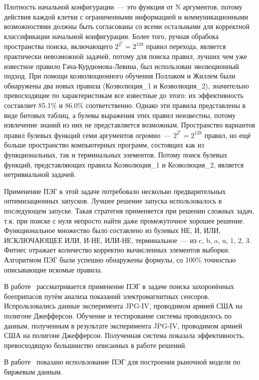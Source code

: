 Плотность начальной конфигурации~--- это функция от N аргументов, потому действия каждой клетки с ограниченными информацией и коммуникационными возможностями должны быть согласованы со всеми остальными для корректной классификации начальной конфигурации. Более того, ручная обрабока пространства поиска, включающего $2^{2^7}=2^{128}$ правил перехода, является практически невозможной задачей, потому для поиска правил, лучших чем уже известное правило Гача-Курдюмова-Левина, был использован эволюционный подход. При помощи коэволюционного обучения Поллаком и Жиллем были обнаружены два новых правила (Коэволюция\_1 и Коэволюция\_2), значительно превосходящие по характеристикам все известные до этого: их эффективность составляет 85.1\% и 86.0\% соответственно. Однако эти правила представлены в виде битовых таблиц, а булевы выражения этих правил неизвестны, потому извлечение знаний из них не представляется возможным.
Пространство вариантов правил булевых функций семи аргументов огромно~--- $2^{2^7}=2^{128}$ правил, но ещё больше пространство компьютерных программ, состоящих как из функциональных, так и терминальных элементов. Потому поиск булевых функций, представляющих правила Коэволюция\_1 и Коэволюция\_2, является нетривиальной задачей.

Применение ПЭГ к этой задаче потребовало несколько предварительных оптимизационных запусков. Лучшее решение запуска использовалось в последующем запуске. Такая стратегия применяется при решении сложных задач, т.к. при поиске с нуля непросто найти даже промежуточное хорошее решение. Функциональное множество было составлено из булевых НЕ, И, ИЛИ, ИСКЛЮЧАЮЩЕЕ ИЛИ, И-НЕ, ИЛИ-НЕ, терминальное~--- из c, b, a, u, 1, 2, 3. Фитнес отражает количество корректно вычисленных элементов выборки. Алгоритмом ПЭГ были успешно обнаружены формулы, со 100\% точностью описывающие искомые правила.

В работе~\cite{Banks:gecco05lbp} рассматривается применение ПЭГ в задаче поиска захоронённых боеприпасов путём анализа показаний электромагнитных сенсоров. Испрользовались данные эксперимента JPG-IV, проводимом армией США на полигоне Джефферсон. Обучение и тестирование системы проводилось по данным, полученным в результате эксперимента JPG-IV, проводимом армией США на полигоне Джефферсон. Полученная система показала эффективность, превосходящую большинство описанных в работе решений.

В работе~\cite{visoiu2011deriving} показано использование ПЭГ для построения рыночной модели по биржевым данным.


